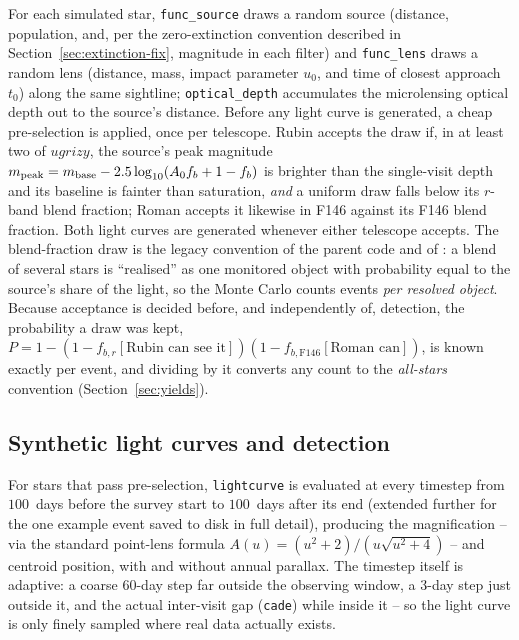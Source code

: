 \documentclass[english,10pt,a4paper]{article}
\begin{document}
	For each simulated star, \texttt{func\_source} draws a random source (distance, population, and, per the zero-extinction convention described in Section~\ref{sec:extinction-fix}, magnitude in each filter) and \texttt{func\_lens} draws a random lens (distance, mass, impact parameter $u_0$, and time of closest approach $t_0$) along the same sightline; \texttt{optical\_depth} accumulates the microlensing optical depth out to the source's distance. Before any light curve is generated, a cheap pre-selection is applied, once per telescope. Rubin accepts the draw if, in at least two of $ugrizy$, the source's peak magnitude $m_{\rm peak} = m_{\rm base} - 2.5\log_{10}(A_0 f_b + 1 - f_b)$ is brighter than the single-visit depth and its baseline is fainter than saturation, \emph{and} a uniform draw falls below its $r$-band blend fraction; Roman accepts it likewise in F146 against its F146 blend fraction. Both light curves are generated whenever either telescope accepts. The blend-fraction draw is the legacy convention of the parent code and of \cite{SajadianMakler2026}: a blend of several stars is ``realised'' as one monitored object with probability equal to the source's share of the light, so the Monte Carlo counts events \emph{per resolved object}. Because acceptance is decided before, and independently of, detection, the probability a draw was kept, $P = 1 - (1 - f_{b,r}[\text{Rubin can see it}])(1 - f_{b,\mathrm{F146}}[\text{Roman can}])$, is known exactly per event, and dividing by it converts any count to the \emph{all-stars} convention (Section~\ref{sec:yields}).
	
	\subsection{Synthetic light curves and detection}
	
	For stars that pass pre-selection, \texttt{lightcurve} is evaluated at every timestep from $100$~days before the survey start to $100$~days after its end (extended further for the one example event saved to disk in full detail), producing the magnification -- via the standard point-lens formula $A(u)=(u^2+2)/(u\sqrt{u^2+4})$ \cite{Paczynski1986} -- and centroid position, with and without annual parallax. The timestep itself is adaptive: a coarse $60$-day step far outside the observing window, a $3$-day step just outside it, and the actual inter-visit gap (\texttt{cade}) while inside it -- so the light curve is only finely sampled where real data actually exists.
	
\end{document}
